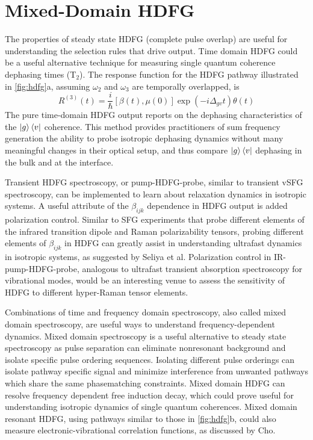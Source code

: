 \documentclass[aip, jcp, reprint, twocolumn]{revtex4-2}
\begin{document}
\section{Mixed-Domain HDFG}\label{mixeddomain}
The properties of steady state HDFG (complete pulse overlap) are useful for understanding the selection rules that drive output.
Time domain HDFG could be a useful alternative technique for measuring single quantum coherence dephasing times (T$_2$).
The response function for the HDFG pathway illustrated in \autoref{fig:hdfg}a, assuming $\omega_2$ and $\omega_3$ are temporally overlapped, is \cite{RN287, Cho2001}
\begin{equation}
	R^{(3)}(t) = \frac{i}{\hbar} [\beta(t), \mu(0)] \exp(-i\Delta_{gv}t) \theta(t) 
\end{equation}  
The pure time-domain HDFG output reports on the dephasing characteristics of the $\ket{g}\bra{v}$ coherence. 
This method provides practitioners of sum frequency generation the ability to probe isotropic dephasing dynamics without many meaningful changes in their optical setup, and thus compare $\ket{g}\bra{v}$ dephasing in the bulk and at the interface.\cite{RN224}

Transient HDFG spectroscopy, or pump-HDFG-probe, similar to transient vSFG spectroscopy, can be implemented to learn about relaxation dynamics in isotropic systems. \cite{RN224, Bonn2024}
A useful attribute of the $\beta_{ijk}$ dependence in HDFG output is added polarization control. 
Similar to SFG experiments that probe different elements of the infrared transition dipole and Raman polarizability tensors, probing different elements of $\beta_{ijk}$ in HDFG can greatly assist in understanding ultrafast dynamics in isotropic systems, as suggested by Seliya et al. \cite{Shen90, RN224, Bonn2024}
Polarization control in IR-pump-HDFG-probe, analogous to ultrafast transient absorption spectroscopy for vibrational modes, would be an interesting venue to assess the sensitivity of HDFG to different hyper-Raman tensor elements. 

Combinations of time and frequency domain spectroscopy, also called mixed domain spectroscopy, are useful ways to understand frequency-dependent dynamics. \cite{RN135, RN171, RN131}
Mixed domain spectroscopy is a useful alternative to steady state spectroscopy as pulse separation can eliminate nonresonant background and isolate specific pulse ordering sequences. \cite{RN372, RN324, McDonnell2024}
Isolating different pulse orderings can isolate pathway specific signal and minimize interference from unwanted pathways which share the same phasematching constraints. 
Mixed domain HDFG can resolve frequency dependent free induction decay, which could prove useful for understanding isotropic dynamics of single quantum coherences. 
Mixed domain resonant HDFG, using pathways similar to those in \autoref{fig:hdfg}b, could also measure electronic-vibrational correlation functions, as discussed by Cho. \cite{Cho2001}
\end{document}
